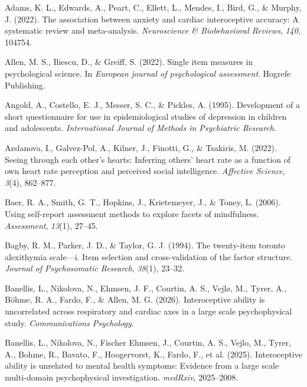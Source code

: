 \documentclass[
  jou,
  floatsintext,
  longtable,
  nolmodern,
  notxfonts,
  notimes,
  colorlinks=true,linkcolor=blue,citecolor=blue,urlcolor=blue]{apa7}
\newlength{\cslhangindent}
\newenvironment{CSLReferences}[2] %
 {\begin{list}{}{%
  \setlength{\itemindent}{0pt}
  \setlength{\leftmargin}{0pt}
  \setlength{\parsep}{0pt}
  \ifodd #1
   \setlength{\leftmargin}{\cslhangindent}
   \setlength{\itemindent}{-1\cslhangindent}
  \fi
  \setlength{\itemsep}{#2\baselineskip}}}
 {\end{list}}
\begin{document}
\label{refs}
\begin{CSLReferences}{1}{0}
Adams, K. L., Edwards, A., Peart, C., Ellett, L., Mendes, I., Bird, G.,
\& Murphy, J. (2022). The association between anxiety and cardiac
interoceptive accuracy: A systematic review and meta-analysis.
\emph{Neuroscience \& Biobehavioral Reviews}, \emph{140}, 104754.

Allen, M. S., Iliescu, D., \& Greiff, S. (2022). Single item measures in
psychological science. In \emph{European journal of psychological
assessment}. Hogrefe Publishing.

Angold, A., Costello, E. J., Messer, S. C., \& Pickles, A. (1995).
Development of a short questionnaire for use in epidemiological studies
of depression in children and adolescents. \emph{International Journal
of Methods in Psychiatric Research}.

Arslanova, I., Galvez-Pol, A., Kilner, J., Finotti, G., \& Tsakiris, M.
(2022). Seeing through each other's hearts: Inferring others' heart rate
as a function of own heart rate perception and perceived social
intelligence. \emph{Affective Science}, \emph{3}(4), 862--877.

Baer, R. A., Smith, G. T., Hopkins, J., Krietemeyer, J., \& Toney, L.
(2006). Using self-report assessment methods to explore facets of
mindfulness. \emph{Assessment}, \emph{13}(1), 27--45.

Bagby, R. M., Parker, J. D., \& Taylor, G. J. (1994). The twenty-item
toronto alexithymia scale---i. Item selection and cross-validation of
the factor structure. \emph{Journal of Psychosomatic Research},
\emph{38}(1), 23--32.

Banellis, L., Nikolova, N., Ehmsen, J. F., Courtin, A. S., Vejlø, M.,
Tyrer, A., Böhme, R. A., Fardo, F., \& Allen, M. G. (2026).
Interoceptive ability is uncorrelated across respiratory and cardiac
axes in a large scale psychophysical study. \emph{Communications
Psychology}.

Banellis, L., Nikolova, N., Fischer Ehmsen, J., Courtin, A. S., Vejlo,
M., Tyrer, A., Bohme, R., Bavato, F., Hoogervorst, K., Fardo, F., et al.
(2025). Interoceptive ability is unrelated to mental health symptoms:
Evidence from a large scale multi-domain psychophysical investigation.
\emph{medRxiv}, 2025--2008.


\end{CSLReferences}
\end{document}
